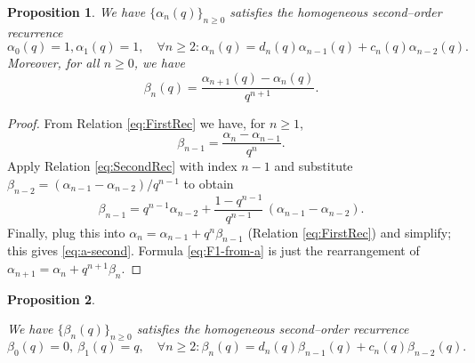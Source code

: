 \documentclass[letterpaper,12pt]{article}
\newtheorem{proposition}{Proposition}
\begin{document}
\begin{proposition}\label{prop:uncouple}
We have $\{\alpha_n(q)\}_{n\ge0}$ satisfies the homogeneous second–order recurrence
\begin{equation}\label{eq:a-second}
\alpha_0(q)=1,  \alpha_1(q)=1,\quad \forall n\geq 2:  \alpha_n(q)=d_n(q)\alpha_{n-1}(q)+c_n(q)\alpha_{n-2}(q).
\end{equation}
Moreover, for all $n\geq 0$, we have
\begin{equation}\label{eq:F1-from-a}
\beta_n(q)=\frac{\alpha_{n+1}(q)-\alpha_n(q)}{q^{n+1}}.
\end{equation}
\end{proposition}

\begin{proof}
From Relation \eqref{eq:FirstRec}   we have, for $n\ge 1$,
\[
\beta_{n-1}=\frac{\alpha_n -\alpha_{n-1} }{q^n}.
\]
Apply Relation \eqref{eq:SecondRec} with index $n-1$ and substitute
$ \beta_{n-2}=(\alpha_{n-1}-\alpha_{n-2})/q^{n-1}$ to obtain
\[
\beta_{n-1}
=q^{n-1}\alpha_{n-2}+\frac{1-q^{n-1}}{q^{n-1}}\,(\alpha_{n-1}-\alpha_{n-2}).
\]
Finally, plug this into $\alpha_n=\alpha_{n-1}+q^n\beta_{n-1}$ (Relation \eqref{eq:FirstRec}) and simplify; this gives \eqref{eq:a-second}.
Formula \eqref{eq:F1-from-a} is just the rearrangement of
$\alpha_{n+1}=\alpha_n+q^{n+1}  \beta_{n}$.
\end{proof}


\begin{proposition}\label{prop:beta-homogeneous-shifted}
 
We have $\{\beta_n(q)\}_{n\ge0}$ satisfies the homogeneous second–order recurrence
\begin{equation}\label{eq:beta-rec}
\beta_0(q)=0,\
\beta_1(q)=q,\quad\forall n\geq 2: \beta_{n}(q)
=
d_n(q)\beta_{n-1}(q)
+c_n(q)\beta_{n-2}(q).
\end{equation}
\end{proposition}
\end{document}
